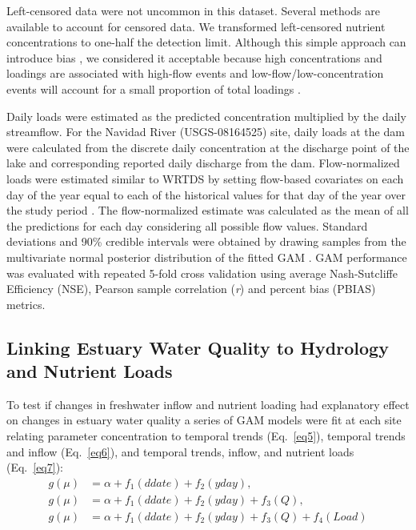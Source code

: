 \documentclass[fleqn,10pt,lineno]{wlpeerj} %
\begin{document}
Left-censored data were not uncommon in this dataset. Several methods
are available to account for censored data. We transformed left-censored
nutrient concentrations to one-half the detection limit. Although this
simple approach can introduce bias
\autocite{hornungEstimationAverageConcentration1990}, we considered it
acceptable because high concentrations and loadings are associated with
high-flow events and low-flow/low-concentration events will account for
a small proportion of total loadings
\autocite{mcdowell_implications_2021}.

Daily loads were estimated as the predicted concentration multiplied by
the daily streamflow. For the Navidad River (USGS-08164525) site, daily
loads at the dam were calculated from the discrete daily concentration
at the discharge point of the lake and corresponding reported daily
discharge from the dam. Flow-normalized loads were estimated similar to
WRTDS by setting flow-based covariates on each day of the year equal to
each of the historical values for that day of the year over the study
period \autocite{hirschWeightedRegressionsTime2010}. The flow-normalized
estimate was calculated as the mean of all the predictions for each day
considering all possible flow values. Standard deviations and 90\%
credible intervals were obtained by drawing samples from the
multivariate normal posterior distribution of the fitted GAM
\autocite{woodConfidenceIntervalsGeneralized2006,marraCoveragePropertiesConfidence2012,mcdowell_implications_2021}.
GAM performance was evaluated with repeated 5-fold cross validation
\autocite{burmanComparativeStudyOrdinary1989} using average
Nash-Sutcliffe Efficiency (NSE), Pearson sample correlation (\emph{r})
and percent bias (PBIAS) metrics.

\hypertarget{linking-estuary-water-quality-to-hydrology-and-nutrient-loads}{%
\subsection*{Linking Estuary Water Quality to Hydrology and Nutrient
Loads}\label{linking-estuary-water-quality-to-hydrology-and-nutrient-loads}}

To test if changes in freshwater inflow and nutrient loading had
explanatory effect on changes in estuary water quality a series of GAM
models were fit at each site relating parameter concentration to
temporal trends (Eq.~\ref{eq5}), temporal trends and inflow
(Eq.~\ref{eq6}), and temporal trends, inflow, and nutrient loads
(Eq.~\ref{eq7}): \begin{align}
g(\mu) &= \alpha + f_1(ddate) + f_2(yday), \label{eq5} \\
g(\mu) &= \alpha + f_1(ddate) + f_2(yday) + f_3(Q), \label{eq6} \\
g(\mu) &= \alpha + f_1(ddate) + f_2(yday) + f_3(Q) + f_4(Load) \label{eq7}
\end{align}
\end{document}
